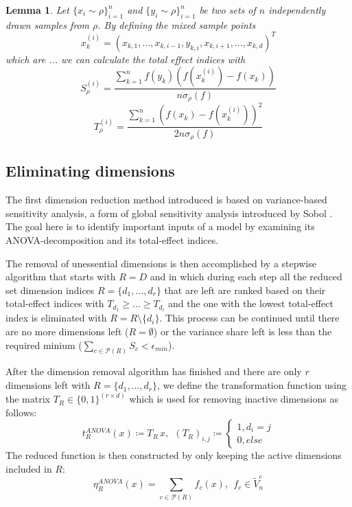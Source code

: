\documentclass[
  a4paper,  %
  twoside,  %
  bibliography=totoc,
  headsepline,
  cleardoublepage=empty,
  parskip=half,
  draft=false
]{scrbook}
\newtheorem{lemma}{Lemma}
\begin{document}
\begin{lemma}
Let $\{x_i \sim \rho\}_{i=1}^n$ and $\{y_i \sim \rho\}_{i=1}^n$ be two sets of $n$ independently drawn samples from $\rho$.
By defining the mixed sample points
\begin{equation}
x_k^{(i)}=(x_{k,1}, \dots,x_{k,i-1}, y_{k,i}, x_{k,i+1},\dots,x_{k,d})^T
\end{equation}
which are ... we can calculate the total effect indices with
\begin{equation}
S_{\rho}^{(i)}=\frac{\sum_{k=1}^n f(y_k) (f(x_k^{(i)}) - f(x_k))}{n \sigma_{\rho}(f)}
\end{equation}
\begin{equation}
T_{\rho}^{(i)}=\frac{\sum_{k=1}^n (f(x_k) - f(x_k^{(i)}))^2}{2n \sigma_{\rho}(f)}
\end{equation}
\end{lemma}

\newpage
\subsection{Eliminating dimensions}

The first dimension reduction method introduced is based on variance-based sensitivity analysis, a form of global sensitivity analysis introduced by Sobol \cite{S01}.
The goal here is to identify important inputs of a model by examining its ANOVA-decomposition and its total-effect indices.

The removal of unessential dimensions is then accomplished by a stepwise algorithm that starts with $R=D$ and in which during each step all the reduced set dimension indices $R=\{d_1, \dots,d_r\}$ that are left are ranked based on their total-effect indices with $T_{d_1} \geq \dots \geq T_{d_i}$ and the one with the lowest total-effect index is eliminated with $R=R \setminus \{d_i\}$.
This process can be continued until there are no more dimensions left ($R=\emptyset$) or the variance share left is less than the required minium ($\sum_{c \in \mathcal{P}(R)} S_{c} < \epsilon_{min}$).

After the dimension removal algorithm has finished and there are only $r$ dimensions left with $R=\{d_1, \dots, d_r\}$,
we define the transformation function using the matrix $T_R \in \{0,1\}^{(r \times d)}$ which is used for removing inactive dimensions as follows:
\begin{equation}
t_R^{ANOVA}(x) \coloneqq T_R \, x, ~~
(T_R)_{i,j} \coloneqq\begin{cases}
    1,  d_i = j\\
    0,  else
\end{cases}
\nonumber
\end{equation}
The reduced function is then constructed by only keeping the active dimensions included in $R$:
\begin{equation}
\eta_R^{ANOVA}(x) = \sum_{c \in \mathcal{P}(R)} f_c(x), ~~ f_c \in \tilde{V}_{n}^c
\label{anovaComponentWise}
\end{equation}
\end{document}
